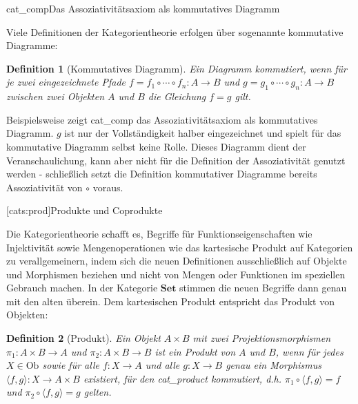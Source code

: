 \documentclass[11pt, a4paper, bibgerm]{scrbook}
\newcommand\lsection{}
\newcommand\abb{}
\newcommand\fig{}
\newcommand\ato{\rightarrow} %
\newtheorem{defini}{Definition}
\newcommand{\defi}[2]{%
  \begin{defini}[#1]
    \label{def:#1}
    #2
  \end{defini}
}
\begin{document}
\fig{cat_comp}{Das Assoziativitätsaxiom als kommutatives Diagramm}

Viele Definitionen der Kategorientheorie erfolgen über sogenannte
kommutative Diagramme:
\defi{Kommutatives Diagramm}{ Ein Diagramm kommutiert, wenn für je zwei
  eingezeichnete Pfade $f=f_1 \circ \cdots \circ f_n : A \rightarrow B$
  und $g=g_1 \circ \cdots \circ g_n : A \rightarrow B$ zwischen zwei
  Objekten $A$ und $B$ die Gleichung $f=g$ gilt.  }
Beispielsweise zeigt \abb{cat_comp} das Assoziativitätsaxiom als
kommutatives Diagramm. $g$ ist nur der Vollständigkeit halber
eingezeichnet und spielt für das kommutative Diagramm selbst keine
Rolle. Dieses Diagramm dient der Veranschaulichung, kann aber nicht für
die Definition der Assoziativität genutzt werden - schließlich setzt die
Definition kommutativer Diagramme bereits Assoziativität von $\circ$
voraus.

\lsection[cats:prod]{Produkte und Coprodukte}

Die Kategorientheorie schafft es, Begriffe für Funktionseigenschaften
wie Injektivität sowie Mengenoperationen wie das kartesische Produkt auf
Kategorien zu verallgemeinern, indem sich die neuen Definitionen
ausschließlich auf Objekte und Morphismen beziehen und nicht von Mengen
oder Funktionen im speziellen Gebrauch machen. In der Kategorie
$\mathbf{Set}$ stimmen die neuen Begriffe dann genau mit den alten
überein. Dem kartesischen Produkt entspricht das Produkt von Objekten:

\defi{Produkt}{ Ein Objekt $A \times B$ mit zwei Projektionsmorphismen
  $\pi_1 : A \times B \ato A$ und $\pi_2 : A \times B \ato B$ ist ein
  Produkt von $A$ und $B$, wenn für jedes $X \in \mathrm{Ob}$ sowie für
  alle $f : X \ato A$ und alle $g : X \ato B$ genau ein Morphismus
  $\langle f,g \rangle : X \ato A \times B$ existiert, für den
  \abb{cat_product} kommutiert, d.h.  $\pi_1 \circ \langle f,g \rangle =
  f$ und $\pi_2 \circ \langle f,g \rangle = g$ gelten.  }
\end{document}
